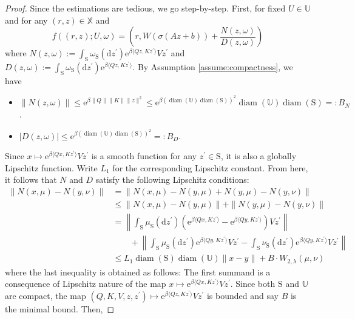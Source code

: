\documentclass[11pt]{article}
\newcommand{\XX}{\mathbb{X}}
\newcommand{\UU}{\mathbb{U}}
\newcommand{\e}{\mathrm{e}} %
\newcommand{\de}{\mathrm{d}} %
\begin{document}
\begin{proof}
    Since the estimations are tedious, we go step-by-step. First, for fixed $U\in\UU$ and for any $(r,z)\in\XX$ and
    \begin{equation*}
        f((r,z);U,\omega) = \left(r, W(\sigma(Az+b)) + \frac{N(z,\omega)}{D(z,\omega)}\right)
    \end{equation*}
    where $N(z,\omega) := \int_{\mathrm{S}}\omega_{\mathrm S}(\de z^\prime)\e^{\beta\langle Qz, Kz^\prime\rangle}Vz^\prime$ and $D(z, \omega) := \int_{\mathrm S} \omega_{\mathrm S}(\de z^\prime)\e^{\beta\langle Qz, Kz^\prime\rangle}$. By Assumption \ref{assume:compactness}, we have
    \begin{itemize}
        \item $\|N(z,\omega)\| \leq \e^{\beta\|Q\|\|K\|\|z\|^2} \leq \e^{\beta(\operatorname{diam}(\UU)\operatorname{diam}(\mathrm{S}))^2}\operatorname{diam}(\UU)\operatorname{diam}(\mathrm{S}) =: B_N$.
        \item $|D(z,\omega)| \leq \e^{\beta(\operatorname{diam}(\UU)\operatorname{diam}(\mathrm{S}))^2} =: B_D$.
    \end{itemize}
    Since $x\mapsto \e^{\beta\langle Qx, Kz^\prime\rangle}Vz^\prime$ is a smooth function for any $z^\prime\in\mathrm{S}$, it is also a globally Lipschitz function. Write $L_1$ for the corresponding Lipschitz constant. From here, it follows that $N$ and $D$ satisfy the following Lipschitz conditions:
    \begin{align*}
        \|N(x,\mu) - N(y,\nu)\| &= \|N(x,\mu) - N(y, \mu) + N(y,\mu) - N(y,\nu)\| \\
        &\leq \|N(x,\mu) - N(y, \mu)\| + \|N(y,\mu) - N(y,\nu)\|\\
        &= \left\|\int_{\mathrm{S}}\mu_{\mathrm S}(\de z^\prime)(\e^{\beta\langle Qx, Kz^\prime\rangle}- \e^{\beta\langle Qy, Kz^\prime\rangle})Vz^\prime\right\| \\
        &\qquad+ \left\|\int_{\mathrm{S}}\mu_{\mathrm S}(\de z^\prime)\e^{\beta\langle Qy, Kz^\prime\rangle}Vz^\prime - \int_{\mathrm{S}}\nu_{\mathrm S}(\de z^\prime)\e^{\beta\langle Qy, Kz^\prime\rangle}Vz^\prime\right\| \\
        &\leq L_1\operatorname{diam}(\mathrm S)\operatorname{diam}(\UU)\|x-y\| + B \cdot W_{2,\lambda}(\mu,\nu) 
\end{align*}
where the last inequality is obtained as follows: The first summand is a consequence of Lipschitz nature of the map $x\mapsto \e^{\beta\langle Qx, Kz^\prime\rangle}Vz^\prime$. Since both $\mathrm{S}$ and $\UU$ are compact, the map $(Q,K,V,z,z^\prime)\mapsto\e^{\beta\langle Qz, Kz^\prime\rangle}Vz^\prime$ is bounded and say $B$ is the minimal bound. Then,

\end{proof}
\end{document}
